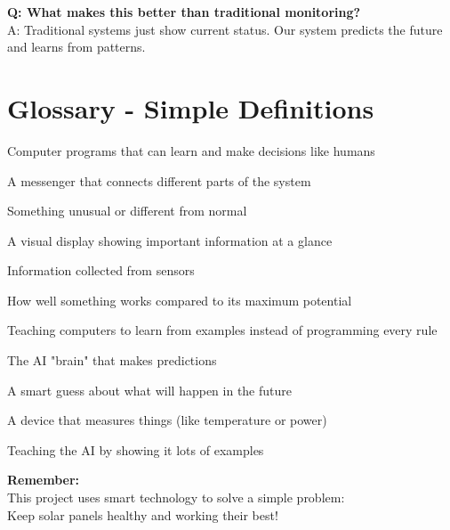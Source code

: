 \documentclass[12pt,a4paper]{article}
\begin{document}
\vspace{0.5cm}

\textbf{Q: What makes this better than traditional monitoring?}\\
A: Traditional systems just show current status. Our system predicts the future and learns from patterns.

\newpage

\section{Glossary - Simple Definitions}

\begin{description}[leftmargin=2cm]
    \item[AI (Artificial Intelligence)] Computer programs that can learn and make decisions like humans
    
    \item[API] A messenger that connects different parts of the system
    
    \item[Anomaly] Something unusual or different from normal
    
    \item[Dashboard] A visual display showing important information at a glance
    
    \item[Data] Information collected from sensors
    
    \item[Efficiency] How well something works compared to its maximum potential
    
    \item[Machine Learning] Teaching computers to learn from examples instead of programming every rule
    
    \item[Model] The AI "brain" that makes predictions
    
    \item[Prediction] A smart guess about what will happen in the future
    
    \item[Sensor] A device that measures things (like temperature or power)
    
    \item[Training] Teaching the AI by showing it lots of examples
\end{description}

\vspace{2cm}

\begin{center}
\begin{tcolorbox}[colback=easygreen!10!white,colframe=easygreen!75!black,width=0.9\textwidth]
\large\centering
\textbf{Remember:}\\[0.5cm]
This project uses smart technology to solve a simple problem:\\
Keep solar panels healthy and working their best!
\end{tcolorbox}
\end{center}
\end{document}
